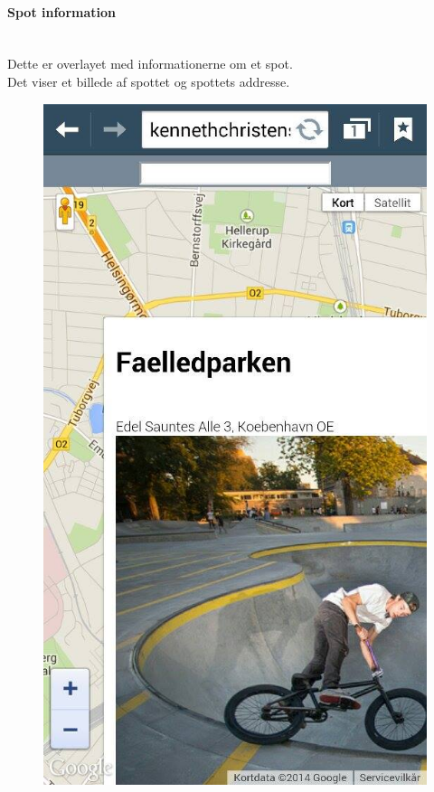\documentclass[12pt]{article}
\begin{document}
\newpage
\paragraph{Spot information}\mbox{}\\
Dette er overlayet med informationerne om et spot.\\ Det viser et billede af spottet og spottets addresse.
\begin{figure}[h]
\includegraphics[scale = 0.3]{markers}
\end{figure}
\end{document}
